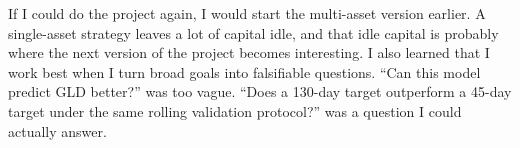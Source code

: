 \documentclass[11pt, letterpaper]{article}
\begin{document}
If I could do the project again, I would start the multi-asset version earlier. A single-asset strategy leaves a lot of capital idle, and that idle capital is probably where the next version of the project becomes interesting. I also learned that I work best when I turn broad goals into falsifiable questions. ``Can this model predict GLD better?'' was too vague. ``Does a 130-day target outperform a 45-day target under the same rolling validation protocol?'' was a question I could actually answer.
\end{document}
